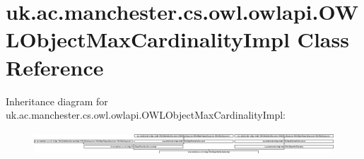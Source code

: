 \hypertarget{classuk_1_1ac_1_1manchester_1_1cs_1_1owl_1_1owlapi_1_1_o_w_l_object_max_cardinality_impl}{\section{uk.\-ac.\-manchester.\-cs.\-owl.\-owlapi.\-O\-W\-L\-Object\-Max\-Cardinality\-Impl Class Reference}
\label{classuk_1_1ac_1_1manchester_1_1cs_1_1owl_1_1owlapi_1_1_o_w_l_object_max_cardinality_impl}
}
Inheritance diagram for uk.\-ac.\-manchester.\-cs.\-owl.\-owlapi.\-O\-W\-L\-Object\-Max\-Cardinality\-Impl\-:\begin{figure}[H]
\begin{center}
\leavevmode
\includegraphics[height=0.882585cm]{classuk_1_1ac_1_1manchester_1_1cs_1_1owl_1_1owlapi_1_1_o_w_l_object_max_cardinality_impl}
\end{center}
\end{figure}
